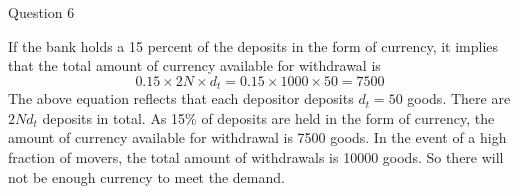 \documentclass[a4paper]{article}
\newif\IfInSansMode
\numberwithin{equation}{section}
\numberwithin{figure}{section}
\begin{document}
\begin{questionbox}{Question 6}
\begin{enumerate}[(a)]
			\begin{explanationbox}
				If the bank holds a 15 percent of the deposits in the form of currency, it implies that the total amount of currency available for withdrawal is
				\[
					0.15 \times 2N \times d_t = 0.15 \times 1000 \times 50 = 7500
				\]
				The above equation reflects that each depositor deposits \( d_t = 50 \) goods. There are \( 2Nd_t \) deposits in total. As 15\% of deposits are held in the form of currency, the amount of currency available for withdrawal is 7500 goods. In the event of a high fraction of movers, the total amount of withdrawals is 10000 goods. So there will not be enough currency to meet the demand.
			\end{explanationbox}
		\end{enumerate}
	\end{questionbox}
\end{document}
